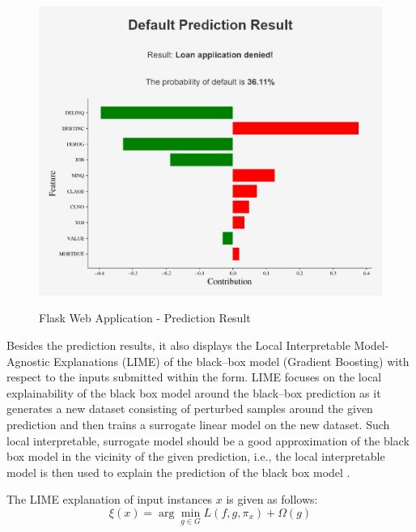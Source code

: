 \begin{figure}[H]
\centering
\caption{Flask Web Application - Prediction Result}\vspace{0.5em}
\label{fig:flaskres}\
\includegraphics[width=130mm]{Figures/flask_app_result.jpg}

\vspace{-1em}
\end{figure}

Besides the prediction results, it also displays the Local Interpretable Model-Agnostic Explanations (LIME) of the black--box model (Gradient Boosting) with respect to the inputs submitted within the form.
LIME focuses on the local explainability of the black box model around the black--box prediction as it generates a new dataset consisting of perturbed samples around the given prediction and then trains a surrogate linear model on the new dataset.
Such local interpretable, surrogate model should be a good approximation of the black box model in the vicinity of the given prediction, i.e., the local interpretable model is then used to explain the prediction of the black box model \citep{ribeiro2016should}.

The LIME explanation of input instances $x$ is given as follows:
\begin{equation}\label{eq}
\xi(x) = \arg\min_{g \in G} L(f, g, \pi_x) + \Omega(g)
\end{equation}

